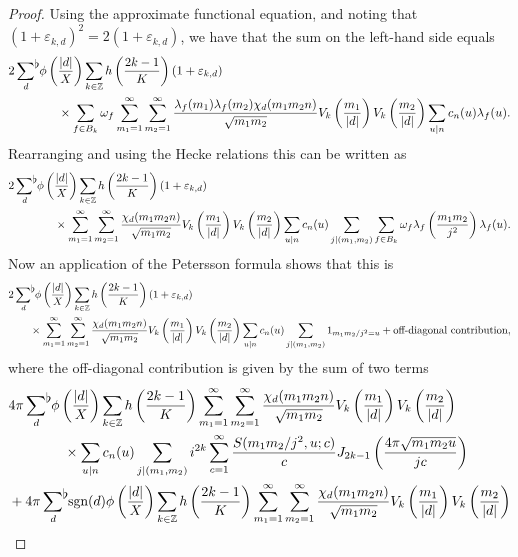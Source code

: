 \documentclass[a4paper,10pt,twoside]{amsart}
\theoremstyle{definition}
\numberwithin{equation}{section}
\newcommand\Z{\mathbb{Z}}
\renewcommand\:{\colon}
\newcommand{\sumflat}{\mathop{{\sum}^{\raisebox{-3pt}{\makebox[0pt][l]{$\flat$}}}}}
\begin{document}
\begin{proof}
Using the approximate functional equation, and noting that $(1+\varepsilon_{k,d})^2=2(1+\varepsilon_{k,d})$, we have that the sum on the left-hand side equals
\begin{align*}
&2\sumflat_{d}\,\phi\left(\frac{|d|}X\right)\sum_{k\in\Z}h\left(\frac{2k-1}K\right)(1+\varepsilon_{k,d})\\
&\qquad\qquad\times\sum_{f\in B_k}\omega_f\sum_{m_1=1}^\infty\sum_{m_2=1}^\infty \frac{\lambda_f(m_1)\lambda_f(m_2)\chi_d(m_1m_2n)}{\sqrt{m_1m_2}}V_k\left(\frac{m_1}{|d|}\right)V_k\left(\frac {m_2}{|d|}\right)\sum_{u|n}c_n(u)\lambda_f(u).  
\end{align*}
Rearranging and using the Hecke relations this can be written as
\begin{align*}
&2\sumflat_{d}\,\phi\left(\frac{|d|}X\right)\sum_{k\in\Z}h\left(\frac{2k-1}K\right)(1+\varepsilon_{k,d})\\
&\qquad\qquad\times\sum_{m_1=1}^\infty\sum_{m_2=1}^\infty \frac{\chi_d(m_1m_2n)}{\sqrt{m_1m_2}}V_k\left(\frac{m_1}{|d|}\right)V_k\left(\frac {m_2}{|d|}\right)\sum_{u|n}c_n(u)\sum_{j|(m_1,m_2)}\sum_{f\in B_k}\omega_f\lambda_f\left(\frac{m_1m_2}{j^2}\right)\lambda_f(u). 
\end{align*}
Now an application of the Petersson formula shows that this is
\begin{align*}
&2\sumflat_{d}\,\phi\left(\frac{|d|}X\right)\sum_{k\in\Z}h\left(\frac{2k-1}K\right)(1+\varepsilon_{k,d})\\
&\qquad\times\sum_{m_1=1}^\infty\sum_{m_2=1}^\infty \frac{\chi_d(m_1m_2n)}{\sqrt{m_1m_2}}V_k\left(\frac{m_1}{|d|}\right)V_k\left(\frac {m_2}{|d|}\right)\sum_{u|n}c_n(u)\sum_{j|(m_1,m_2)}1_{m_1m_2/j^2=u}+\text{off-diagonal contribution},
\end{align*}
where the off-diagonal contribution is given by the sum of two terms
\begin{align}\label{off-diagonal-sums}
&4\pi\sumflat_{d}\,\phi\left(\frac{|d|}X\right)\sum_{k\in\Z}h\left(\frac{2k-1}K\right)\sum_{m_1=1}^\infty\sum_{m_2=1}^\infty \frac{\chi_d(m_1m_2n)}{\sqrt{m_1m_2}}V_k\left(\frac{m_1}{|d|}\right)V_k\left(\frac {m_2}{|d|}\right) \nonumber\\
&\qquad\qquad\times\sum_{u|n}c_n(u)\sum_{j|(m_1,m_2)}i^{2k}\sum_{c=1}^\infty\frac{S(m_1m_2/j^2,u;c)}{c}J_{2k-1}\left(\frac{4\pi\sqrt{m_1m_2u}}{jc}\right) \nonumber\\
&+4\pi\sumflat_{d}\,\text{sgn}(d)\phi\left(\frac{|d|}X\right)\sum_{k\in\Z}h\left(\frac{2k-1}K\right)\sum_{m_1=1}^\infty\sum_{m_2=1}^\infty \frac{\chi_d(m_1m_2n)}{\sqrt{m_1m_2}}V_k\left(\frac{m_1}{|d|}\right)V_k\left(\frac {m_2}{|d|}\right)\\

\end{align}
\end{proof}
\end{document}
